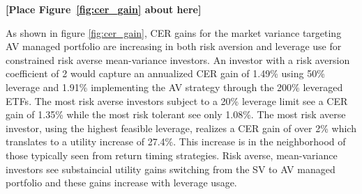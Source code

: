 \bigskip
\centerline{\bf [Place Figure~\ref{fig:cer_gain} about here]}
\bigskip

As shown in figure \ref{fig:cer_gain}, CER gains for the market variance targeting AV managed portfolio are increasing in both risk aversion and leverage use for constrained risk averse mean-variance investors. An investor with a risk aversion coefficient of 2 would capture an annualized CER gain of 1.49\% using 50\% leverage and 1.91\% implementing the AV strategy through the 200\% leveraged ETFs. The most risk averse investors subject to a 20\% leverage limit see a CER gain of 1.35\% while the most risk tolerant see only 1.08\%. The most risk averse investor, using the highest feasible leverage, realizes a CER gain of over 2\% which translates to a utility increase of 27.4\%. This increase is in the neighborhood of those typically seen from return timing strategies. \citep{campbell1997econometrics,moreira_volatility-managed_2017} Risk averse, mean-variance investors see substaincial utility gains switching from the SV to AV managed portfolio and these gains increase with leverage usage.

